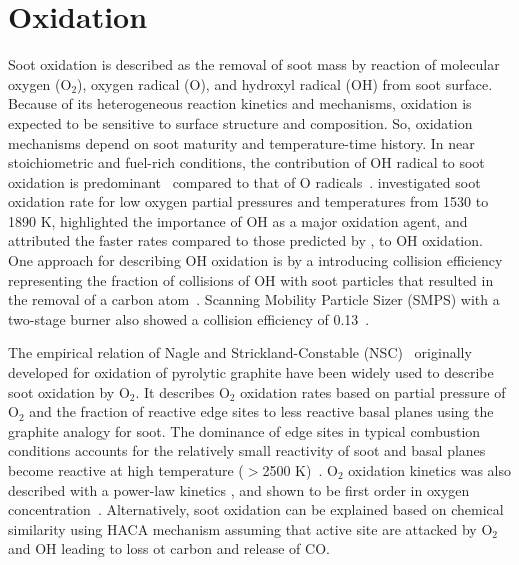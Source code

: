 \section{Oxidation}
Soot oxidation is described as the removal of soot mass by reaction of molecular oxygen ($\mathrm{O_2}$), oxygen radical (O), and hydroxyl radical (OH) from soot surface. Because of its heterogeneous reaction kinetics and mechanisms, oxidation is expected to be sensitive to surface structure and composition. So, oxidation mechanisms depend on soot maturity and temperature-time history. In near stoichiometric and fuel-rich conditions, the contribution of OH radical to soot oxidation is predominant~\citep{neoh1981soot} compared to that of O radicals~\citep{lighty2009soot}. \citet{fenimore1967oxidation} investigated soot oxidation rate for low oxygen
partial pressures and temperatures from 1530 to 1890 K, highlighted the importance of OH as a major oxidation agent, and attributed the faster rates
compared to those predicted by \citet{lee1962rate}, to OH oxidation. One approach for describing OH oxidation is by a introducing collision efficiency representing the fraction of collisions of OH with soot particles that resulted in the removal of a carbon atom~\citep{neoh1981soot}. Scanning Mobility Particle Sizer (SMPS) with a two-stage burner also
showed a collision efficiency of 0.13~\citep{bartok1991fossil}.

The empirical relation of Nagle and Strickland-Constable (NSC)~\citep{nagle1962oxidation} originally developed for oxidation of pyrolytic graphite have been widely used to describe soot oxidation by $\mathrm{O_2}$. It describes $\mathrm{O_2}$ oxidation rates based on partial pressure of  $\mathrm{O_2}$ and the fraction of reactive edge sites to less reactive basal planes using the graphite analogy for soot. The dominance of edge sites in typical combustion conditions accounts for the relatively small reactivity of soot and basal planes become reactive at high temperature ($>$2500 K)~\citep{lighty2009soot}. $\mathrm{O_2}$ oxidation kinetics was also described with a power-law kinetics \cite{lee1962rate}, and shown to be first order in oxygen concentration~\citep{neeft1997kinetics}. Alternatively, soot oxidation can be explained based on chemical similarity using HACA mechanism assuming that active site are attacked by $\mathrm{O_2}$ and OH leading to loss ot carbon and release of CO.

